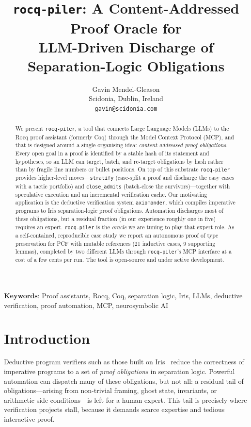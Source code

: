 \documentclass[11pt,a4paper]{article}
\newcommand{\tool}{\texttt{rocq-piler}\xspace}
\newcommand{\axm}{\texttt{axiomander}\xspace}
\begin{document}
\title{\tool: A Content-Addressed Proof Oracle for\\ LLM-Driven Discharge of Separation-Logic Obligations}

\author{Gavin Mendel-Gleason\\
Scidonia, Dublin, Ireland\\
\texttt{gavin@scidonia.com}}

\maketitle

\begin{abstract}
We present \tool, a tool that connects Large Language Models (LLMs) to the Rocq
proof assistant (formerly Coq) through the Model Context Protocol (MCP), and that
is designed around a single organising idea: \emph{content-addressed proof
obligations}. Every open goal in a proof is identified by a stable hash of its
statement and hypotheses, so an LLM can target, batch, and re-target obligations
by hash rather than by fragile line numbers or bullet positions. On top of this
substrate \tool provides higher-level moves---\texttt{stratify} (case-split a
proof and discharge the easy cases with a tactic portfolio) and
\texttt{close\_admits} (batch-close the survivors)---together with speculative
execution and an incremental verification cache. Our motivating application is
the deductive verification system \axm, which compiles imperative programs to
Iris separation-logic proof obligations. Automation discharges most of these
obligations, but a residual fraction (in our experience roughly one in five)
requires an expert. \tool is the \emph{oracle} we are tuning to play that
expert role. As a self-contained, reproducible case study we report an
autonomous proof of type preservation for PCF with mutable references (21
inductive cases, 9 supporting lemmas), completed by two different LLMs through
\tool's MCP interface at a cost of a few cents per run. The tool is open-source
and under active development.
\end{abstract}

\noindent\textbf{Keywords}: Proof assistants, Rocq, Coq, separation logic, Iris,
LLMs, deductive verification, proof automation, MCP, neurosymbolic AI

\section{Introduction}

Deductive program verifiers such as those built on Iris~\cite{jung2018iris}
reduce the correctness of imperative programs to a set of \emph{proof
obligations} in separation logic. Powerful automation can dispatch many of these
obligations, but not all: a residual tail of obligations---arising from
non-trivial framing, ghost state, invariants, or arithmetic side conditions---is
left for a human expert. This tail is precisely where verification projects stall,
because it demands scarce expertise and tedious interactive proof.
\end{document}
